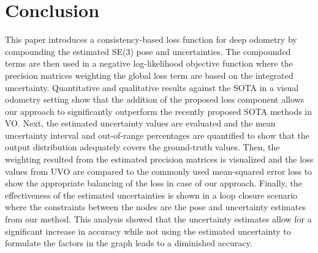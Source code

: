 \documentclass[letterpaper, 10 pt]{ieeeconf}  %
\begin{document}
\section{Conclusion}
This paper introduces a consistency-based loss function for deep odometry by compounding the estimated SE(3) pose and uncertainties. The compounded terms are then used in a negative log-likelihood objective function where the precision matrices weighting the global loss term are based on the integrated uncertainty. Quantitative and qualitative results against the SOTA in a visual odometry setting show that the addition of the proposed loss component allows our approach to significantly outperform the recently proposed SOTA methods in VO. Next, the estimated uncertainty values are evaluated and the mean uncertainty interval and out-of-range percentages are quantified to show that the output distribution adequately covers the ground-truth values. Then, the weighting resulted from the estimated precision matrices is visualized and the loss values from UVO are compared to the commonly used mean-squared error loss to show the appropriate balancing of the loss in case of our approach. Finally, the effectiveness of the estimated uncertainties is shown in a loop closure scenario where the constraints between the nodes are the pose and uncertainty estimates from our method. This analysis showed that the uncertainty estimates allow for a significant increase in accuracy while not using the estimated uncertainty to formulate the factors in the graph leads to a diminished accuracy.

\addtolength{\textheight}{-12cm}   %













\end{document}
